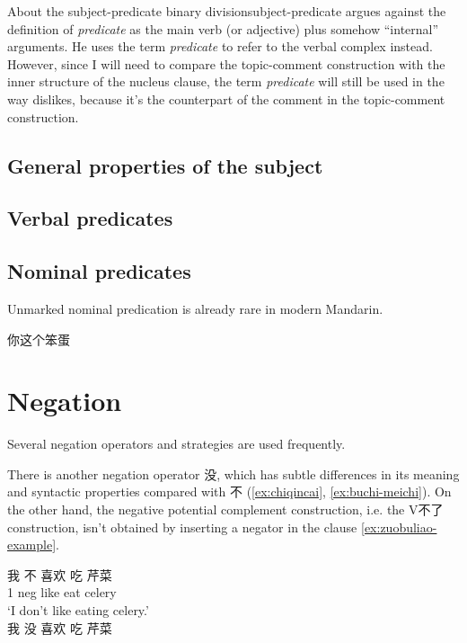 \documentclass[UTF8, a4paper, oneside, scheme=plain, 12pt]{ctexrep}
\newcommand*{\term}[1]{\emph{#1}}
\newcommand{\translate}[1]{`#1'}
\begin{document}
\begin{infobox}{About the subject-predicate binary division}{subject-predicate}
    \citet{dixon2009basic} argues against the definition of \term{predicate} 
    as the main verb (or adjective) plus somehow ``internal'' arguments.
    He uses the term \term{predicate} to refer to the verbal complex instead.
    However, since I will need to compare the topic-comment construction 
    with the inner structure of the nucleus clause,
    the term \term{predicate} will still be used in the way \citet{dixon2009basic} dislikes,
    because it's the counterpart of the comment in the topic-comment construction.
\end{infobox}

\subsection{General properties of the subject}

\subsection{Verbal predicates}

\subsection{Nominal predicates}

Unmarked nominal predication is already rare in modern Mandarin.

\begin{exe}
    \ex 你这个笨蛋
\end{exe}

\section{Negation}\label{sec:negation}


Several negation operators and strategies are used frequently.

There is another negation operator 没, 
which has subtle differences in its meaning and syntactic properties compared with 不
(\ref{ex:chiqincai}, \ref{ex:buchi-meichi}).
On the other hand, the negative potential complement construction,
i.e. the V不了 construction,
isn't obtained by inserting a negator in the clause \eqref{ex:zuobuliao-example}.

\begin{exe}
    \ex \begin{xlist}
        \ex \gll 我 不 喜欢 吃 芹菜 \\
        1 \acs{neg} like eat celery \\
        \glt \translate{I don't like eating celery.} \\
        \ex * 我 没 喜欢 吃 芹菜
    \end{xlist}
    \label{ex:chiqincai}
\end{exe}
\end{document}
